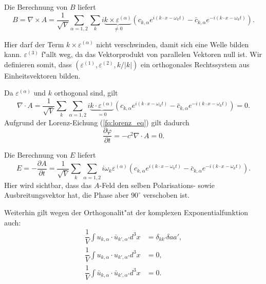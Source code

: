 Die Berechnung von $B$ liefert
\begin{equation*}
B = \nabla \times A = \frac{1}{ \sqrt{V}} \sum_{\alpha=1,2}  \sum_k i \underbrace{k \times \varepsilon^{(\alpha)}}_{\neq 0} \left(c_{k,\alpha} e^{i (k \cdot x - \omega_k t)} - \bar{c}_{k,\alpha} e^{-i(k \cdot x - \omega_k t)} \right).
\end{equation*}

Hier darf der Term $k \times \varepsilon^{(\alpha)}$ nicht verschwinden, damit sich eine Welle bilden kann. $\varepsilon^{(3)}$ f"allt weg, da das Vektorprodukt von parallelen Vektoren null ist. Wir definieren somit, dass $(\varepsilon^{(1)}, \varepsilon^{(2)} , k/|k|)$ ein orthogonales Rechtssystem aus Einheitsvektoren bilden.

Da $\varepsilon^{(\alpha)}$ und $k$ orthogonal sind, gilt
\begin{equation*}
\nabla \cdot A = \frac{1}{\sqrt{V}} \sum_k \sum_{\alpha=1,2} i \underbrace{k \cdot \varepsilon^{(\alpha)}}_{=0} \left(c_{k,\alpha} e^{i (k \cdot x - \omega_k t)} - \bar{c}_{k,\alpha} e^{-i(k \cdot x - \omega_k t)}\right) = 0.
\end{equation*}
Aufgrund der Lorenz-Eichung (\ref{fq:lorenz_eq}) gilt dadurch
\begin{equation*}
\frac{\partial \varphi }{\partial t} = - c^2 \nabla \cdot A = 0.
\end{equation*}

Die Berechnung von $E$ liefert
\begin{equation*}
	E = - \frac{\partial A}{\partial t} = \frac{1}{\sqrt{V}} \sum_k \sum_{\alpha=1,2} i \omega_k \varepsilon^{(\alpha)} \left(c_{k,\alpha} e^{i (k \cdot x - \omega_k t)} - \bar{c}_{k,\alpha} e^{-i(k \cdot x - \omega_k t)} \right).
\end{equation*}
Hier wird sichtbar, dass das $A$-Feld den selben Polarisations- sowie Ausbreitungsvektor hat, die Phase aber $90^\circ$ verschoben ist.

Weiterhin gilt wegen der Orthogonalit"at der komplexen Exponentialfunktion auch:
\begin{align*}
\dfrac{1}{V} \int u_{k,\alpha} \cdot \bar{u}_{k',\alpha'} d^3 x &= \delta_{kk'}\delta{aa'}, \\
\dfrac{1}{V} \int u_{k,\alpha} \cdot u_{k',\alpha'} d^3 x &= 0, \\
\dfrac{1}{V} \int \bar{u}_{k,\alpha} \cdot \bar{u}_{k',\alpha'} d^3 x &= 0.
\end{align*}

